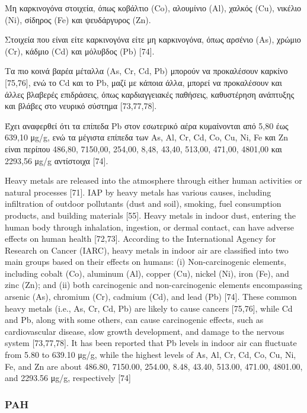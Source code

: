 Μη καρκινογόνα στοιχεία, όπως κοβάλτιο (Co), αλουμίνιο (Al), χαλκός (Cu), νικέλιο (Ni), σίδηρος (Fe) και ψευδάργυρος (Zn).

Στοιχεία που είναι είτε καρκινογόνα είτε μη καρκινογόνα, όπως αρσένιο (As), χρώμιο (Cr), κάδμιο (Cd) και μόλυβδος (Pb) [74].

Τα πιο κοινά βαρέα μέταλλα (As, Cr, Cd, Pb) μπορούν να προκαλέσουν καρκίνο [75,76], ενώ το Cd και το Pb, μαζί με κάποια άλλα, μπορεί να προκαλέσουν και άλλες βλαβερές επιδράσεις, όπως καρδιαγγειακές παθήσεις, καθυστέρηση ανάπτυξης και βλάβες στο νευρικό σύστημα [73,77,78].

Έχει αναφερθεί ότι τα επίπεδα Pb στον εσωτερικό αέρα κυμαίνονται από 5,80 έως 639,10 μg/g, ενώ τα μέγιστα επίπεδα των As, Al, Cr, Cd, Co, Cu, Ni, Fe και Zn είναι περίπου 486,80, 7150,00, 254,00, 8,48, 43,40, 513,00, 471,00, 4801,00 και 2293,56 μg/g αντίστοιχα [74].

\cite{ijerph17238972}



Heavy metals are released into the atmosphere through either human activities or natural processes [71]. IAP by heavy metals has various causes, including infiltration of outdoor pollutants (dust and soil), smoking, fuel consumption products, and building materials [55]. Heavy metals in indoor dust, entering the human body through inhalation, ingestion, or dermal contact, can have adverse effects on human health [72,73]. According to the International Agency for Research on Cancer (IARC), heavy metals in indoor air are classified into two main groups based on their effects on humans: (i) Non-carcinogenic elements, including cobalt (Co), aluminum (Al), copper (Cu), nickel (Ni), iron (Fe), and zinc (Zn); and (ii) both carcinogenic and non-carcinogenic elements encompassing arsenic (As), chromium (Cr), cadmium (Cd), and lead (Pb) [74]. These common heavy metals (i.e., As, Cr, Cd, Pb) are likely to cause cancers [75,76], while Cd and Pb, along with some others, can cause carcinogenic effects, such as cardiovascular disease, slow growth development, and damage to the nervous system [73,77,78]. It has been reported that Pb levels in indoor air can fluctuate from 5.80 to 639.10 μg/g, while the highest levels of As, Al, Cr, Cd, Co, Cu, Ni, Fe, and Zn are about 486.80, 7150.00, 254.00, 8.48, 43.40, 513.00, 471.00, 4801.00, and 2293.56 μg/g, respectively [74]

\cite{ijerph17238972}

\subsubsection{PAH}

